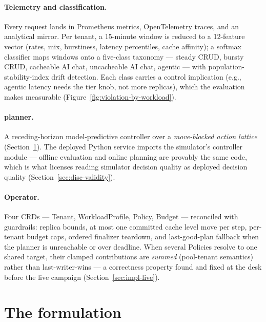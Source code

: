 \paragraph{Telemetry and classification.} Every request lands in Prometheus
metrics, OpenTelemetry traces, and an analytical mirror. Per tenant, a
15-minute window is reduced to a 12-feature vector (rates, mix, burstiness,
latency percentiles, cache affinity); a softmax classifier maps windows onto
a five-class taxonomy --- steady CRUD, bursty CRUD, cacheable AI chat,
uncacheable AI chat, agentic --- with population-stability-index drift
detection. Each class carries a control implication (e.g., agentic latency
needs the tier knob, not more replicas), which the evaluation makes
measurable (Figure~\ref{fig:violation-by-workload}).

\paragraph{\jcac{} planner.} A receding-horizon model-predictive controller
over a \emph{move-blocked action lattice} (Section~\ref{sec:design-jcac}).
The deployed Python service imports the simulator's controller module ---
offline evaluation and online planning are provably the same code, which is
what licenses reading simulator decision quality as deployed decision
quality (Section~\ref{sec:disc-validity}).

\paragraph{Operator.} Four CRDs --- Tenant, WorkloadProfile, Policy, Budget
--- reconciled with guardrails: replica bounds, at most one committed cache
level move per step, per-tenant budget caps, ordered finalizer teardown, and
last-good-plan fallback when the planner is unreachable or over deadline.
When several Policies resolve to one shared target, their clamped
contributions are \emph{summed} (pool-tenant semantics) rather than
last-writer-wins --- a correctness property found and fixed at the desk
before the live campaign (Section~\ref{sec:impl-live}).

\section{The \jcac{} formulation}
\label{sec:design-jcac}

